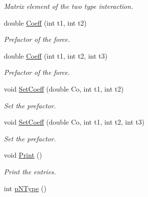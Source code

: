 \begin{DoxyCompactItemize}
\begin{DoxyCompactList}\small\item\em Matrix element of the two type interaction. \end{DoxyCompactList}\item 
double \hyperlink{classMatInt_a1c5a9c480e688013bf93d9d5409319e5}{Coeff} (int t1, int t2)\hypertarget{classMatInt_a1c5a9c480e688013bf93d9d5409319e5}{}\label{classMatInt_a1c5a9c480e688013bf93d9d5409319e5}

\begin{DoxyCompactList}\small\item\em Prefactor of the force. \end{DoxyCompactList}\item 
double \hyperlink{classMatInt_ae8e7d621d6f37fce1bc204eb4d1a1079}{Coeff} (int t1, int t2, int t3)\hypertarget{classMatInt_ae8e7d621d6f37fce1bc204eb4d1a1079}{}\label{classMatInt_ae8e7d621d6f37fce1bc204eb4d1a1079}

\begin{DoxyCompactList}\small\item\em Prefactor of the force. \end{DoxyCompactList}\item 
void \hyperlink{classMatInt_a80ec8280d13d4c35f089d48a67e8e00b}{Set\+Coeff} (double Co, int t1, int t2)\hypertarget{classMatInt_a80ec8280d13d4c35f089d48a67e8e00b}{}\label{classMatInt_a80ec8280d13d4c35f089d48a67e8e00b}

\begin{DoxyCompactList}\small\item\em Set the prefactor. \end{DoxyCompactList}\item 
void \hyperlink{classMatInt_a34c5f2d111d2748ac8ddcdb4ef6a53b7}{Set\+Coeff} (double Co, int t1, int t2, int t3)\hypertarget{classMatInt_a34c5f2d111d2748ac8ddcdb4ef6a53b7}{}\label{classMatInt_a34c5f2d111d2748ac8ddcdb4ef6a53b7}

\begin{DoxyCompactList}\small\item\em Set the prefactor. \end{DoxyCompactList}\item 
void \hyperlink{classMatInt_a9dcac18006ce057b8d78c847174c1362}{Print} ()\hypertarget{classMatInt_a9dcac18006ce057b8d78c847174c1362}{}\label{classMatInt_a9dcac18006ce057b8d78c847174c1362}

\begin{DoxyCompactList}\small\item\em Print the entries. \end{DoxyCompactList}\item 
int \hyperlink{classMatInt_a6496acd0cba8289e8306507336dd2f88}{p\+N\+Type} ()\hypertarget{classMatInt_a6496acd0cba8289e8306507336dd2f88}{}\label{classMatInt_a6496acd0cba8289e8306507336dd2f88}


\end{DoxyCompactItemize}
